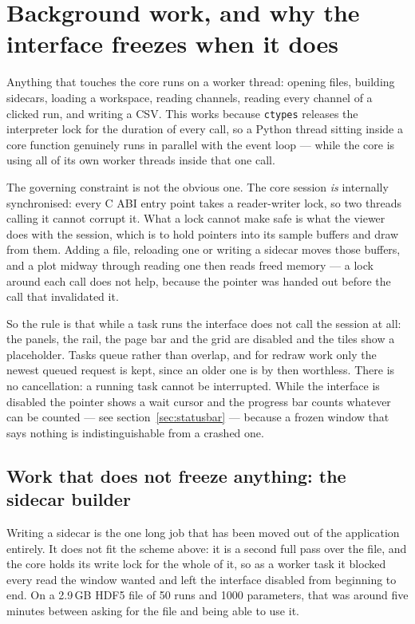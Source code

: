 \documentclass[11pt,a4paper,oneside]{report}
\newcommand{\code}[1]{\texttt{#1}}
\begin{document}
\section{Background work, and why the interface freezes when it does}

Anything that touches the core runs on a worker thread: opening files, building
sidecars, loading a workspace, reading channels, reading every channel of a
clicked run, and writing a CSV. This works because \code{ctypes} releases the
interpreter lock for the duration of every call, so a Python thread sitting
inside a core function genuinely runs in parallel with the event loop --- while
the core is using all of its own worker threads inside that one call.

The governing constraint is not the obvious one. The core session \emph{is}
internally synchronised: every C ABI entry point takes a reader-writer lock, so
two threads calling it cannot corrupt it. What a lock cannot make safe is what
the viewer does with the session, which is to hold pointers into its sample
buffers and draw from them. Adding a file, reloading one or writing a sidecar
moves those buffers, and a plot midway through reading one then reads freed
memory --- a lock around each call does not help, because the pointer was handed
out before the call that invalidated it.

So the rule is that while a task runs the interface does not call the session at
all: the panels, the rail, the page bar and the grid are disabled and the tiles
show a placeholder. Tasks queue rather than overlap, and for redraw work only
the newest queued request is kept, since an older one is by then worthless.
There is no cancellation: a running task cannot be interrupted. While the
interface is disabled the pointer shows a wait cursor and the progress bar
counts whatever can be counted --- see section~\ref{sec:statusbar} --- because
a frozen window that says nothing is indistinguishable from a crashed one.

\subsection{Work that does not freeze anything: the sidecar builder}
\label{sec:sidecar-writer}

Writing a sidecar is the one long job that has been moved out of the
application entirely. It does not fit the scheme above: it is a second full pass
over the file, and the core holds its write lock for the whole of it, so as a
worker task it blocked every read the window wanted and left the interface
disabled from beginning to end. On a 2.9\,GB HDF5 file of 50 runs and 1000
parameters, that was around five minutes between asking for the file and being
able to use it.
\end{document}
